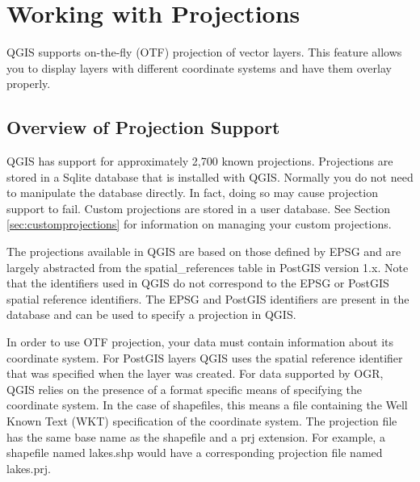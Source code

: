 
\section{Working with Projections}\label{label_projections}

QGIS supports on-the-fly (OTF) projection of vector layers. This feature allows you
to display layers with different coordinate systems and have them overlay
properly.

\subsection{Overview of Projection Support}\label{label_projoverview}

QGIS has support for approximately 2,700 known projections. 
Projections are stored in a Sqlite database that is installed with QGIS.
Normally you do not need to manipulate the database directly. In fact,
doing so may cause projection support to fail. Custom projections are
stored in a user database. See Section \ref{sec:customprojections} for
information on managing your custom projections.

The projections available in QGIS are based on those defined by
EPSG and are
largely abstracted from the spatial\_references table in
PostGIS version 1.x.
Note that the identifiers used in QGIS do not correspond to the EPSG or
PostGIS spatial reference identifiers. The EPSG and PostGIS identifiers are
present in the database and can be used to specify a projection in QGIS.

In order to use OTF projection, your data must contain information about its
coordinate system. For PostGIS layers QGIS uses the spatial reference
identifier that was specified when the layer was created. For data supported
by OGR, QGIS relies on the presence of a format specific means of specifying
the coordinate system. In the case of shapefiles, this means a file containing
the Well Known Text (WKT) specification of the coordinate
system. The
projection file has the same base name as the shapefile and a prj extension.
For example, a shapefile named lakes.shp would have a corresponding projection
file named lakes.prj.


